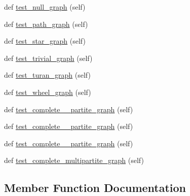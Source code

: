 \begin{DoxyCompactItemize}
def \hyperlink{classnetworkx_1_1generators_1_1tests_1_1test__classic_1_1TestGeneratorClassic_a03d0d7e9785a07e2baa4885e1a0b7100}{test\+\_\+null\+\_\+graph} (self)
\item 
def \hyperlink{classnetworkx_1_1generators_1_1tests_1_1test__classic_1_1TestGeneratorClassic_a819f5d1b555aad1ce6eac73bd384e3c5}{test\+\_\+path\+\_\+graph} (self)
\item 
def \hyperlink{classnetworkx_1_1generators_1_1tests_1_1test__classic_1_1TestGeneratorClassic_afc4ecd8515b9f636193109d8b8ec081b}{test\+\_\+star\+\_\+graph} (self)
\item 
def \hyperlink{classnetworkx_1_1generators_1_1tests_1_1test__classic_1_1TestGeneratorClassic_a5abbbca9b62dc00a8b0e3791c8014a04}{test\+\_\+trivial\+\_\+graph} (self)
\item 
def \hyperlink{classnetworkx_1_1generators_1_1tests_1_1test__classic_1_1TestGeneratorClassic_ac03c92e14c7b47b48c9547759f161ef2}{test\+\_\+turan\+\_\+graph} (self)
\item 
def \hyperlink{classnetworkx_1_1generators_1_1tests_1_1test__classic_1_1TestGeneratorClassic_a1695d2b1d14103ec60439bb03e2ed0ac}{test\+\_\+wheel\+\_\+graph} (self)
\item 
def \hyperlink{classnetworkx_1_1generators_1_1tests_1_1test__classic_1_1TestGeneratorClassic_acf506628c7000e51ee160f9f241ee9da}{test\+\_\+complete\+\_\+\_\+partite\+\_\+graph} (self)
\item 
def \hyperlink{classnetworkx_1_1generators_1_1tests_1_1test__classic_1_1TestGeneratorClassic_ac54e1859a9d004a57dd3a50698fe7683}{test\+\_\+complete\+\_\+\_\+partite\+\_\+graph} (self)
\item 
def \hyperlink{classnetworkx_1_1generators_1_1tests_1_1test__classic_1_1TestGeneratorClassic_a85de64cc4e29f307382198f613636711}{test\+\_\+complete\+\_\+\_\+partite\+\_\+graph} (self)
\item 
def \hyperlink{classnetworkx_1_1generators_1_1tests_1_1test__classic_1_1TestGeneratorClassic_ab84774d3864719c21bdbe078e74bfb1e}{test\+\_\+complete\+\_\+multipartite\+\_\+graph} (self)
\end{DoxyCompactItemize}


\subsection{Member Function Documentation}
\mbox{\label{classnetworkx_1_1generators_1_1tests_1_1test__classic_1_1TestGeneratorClassic_a5be7df07b5143d50d1982431d7975f5d}} 
